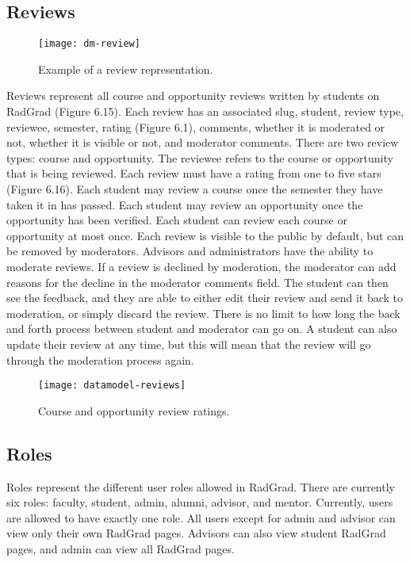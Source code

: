 \subsection{Reviews}
\begin{figure}[htbp!]
\centering
\texttt{[image: dm-review]}
\caption{Example of a review representation.}
\end{figure}
Reviews represent all course and opportunity reviews written by students on RadGrad (Figure 6.15). Each review has an associated slug, student, review type, reviewee, semester, rating (Figure 6.1), comments, whether it is moderated or not, whether it is visible or not, and moderator comments. There are two review types: course and opportunity. The reviewee refers to the course or opportunity that is being reviewed. Each review must have a rating from one to five stars (Figure 6.16). Each student may review a course once the semester they have taken it in has passed. Each student may review an opportunity once the opportunity has been verified. Each student can review each course or opportunity at most once. Each review is visible to the public by default, but can be removed by moderators. Advisors and administrators have the ability to moderate reviews. If a review is declined by moderation, the moderator can add reasons for the decline in the moderator comments field. The student can then see the feedback, and they are able to either edit their review and send it back to moderation, or simply discard the review. There is no limit to how long the back and forth process between student and moderator can go on. A student can also update their review at any time, but this will mean that the review will go through the moderation process again.

\begin{figure}[htbp!]
\centering
\texttt{[image: datamodel-reviews]}
\caption{Course and opportunity review ratings.}
\end{figure}

\subsection{Roles}
Roles represent the different user roles allowed in RadGrad. There are currently six roles: faculty, student, admin, alumni, advisor, and mentor. Currently, users are allowed to have exactly one role. All users except for admin and advisor can view only their own RadGrad pages. Advisors can also view student RadGrad pages, and admin can view all RadGrad pages. 

